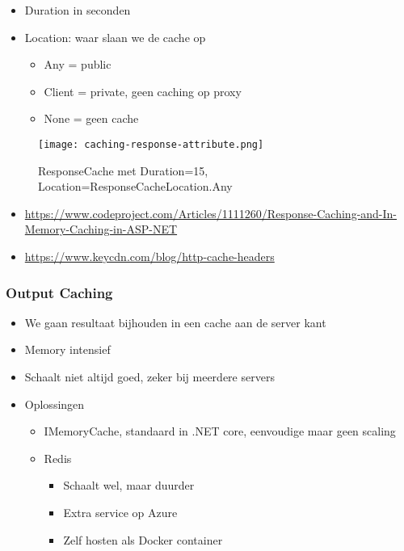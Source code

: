 \documentclass{article}
\begin{document}
\begin{itemize}
    \item Duration in seconden
    \item Location: waar slaan we de cache op
    \begin{itemize}
        \item Any = public
        \item Client = private, geen caching op proxy
        \item None = geen cache
    \end{itemize}
\end{itemize}

\begin{figure}[H]
    \centering
    \texttt{[image: caching-response-attribute.png]}
    \caption{ResponseCache met Duration=15, Location=ResponseCacheLocation.Any}
\end{figure}


\begin{itemize}
    \item \url{https://www.codeproject.com/Articles/1111260/Response-Caching-and-In-Memory-Caching-in-ASP-NET}
    \item \url{https://www.keycdn.com/blog/http-cache-headers}
\end{itemize}

\subsubsection{Output Caching}

\begin{itemize}
    \item We gaan resultaat bijhouden in een cache aan de server kant
    \item Memory intensief
    \item Schaalt niet altijd goed, zeker bij meerdere servers
    \item Oplossingen
    \begin{itemize}
        \item IMemoryCache, standaard in .NET core, eenvoudige maar geen scaling
        \item Redis
        \begin{itemize}
            \item Schaalt wel, maar duurder
            \item Extra service op Azure
            \item Zelf hosten als Docker container
        \end{itemize}
    \end{itemize}
\end{itemize}
\end{document}

